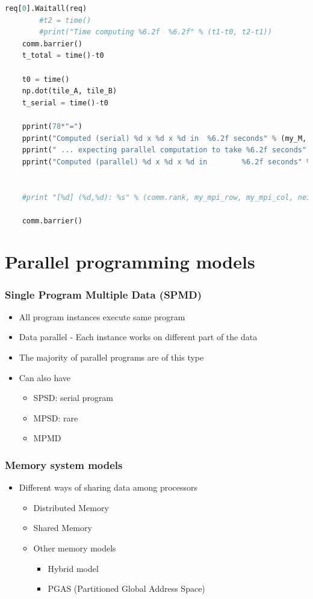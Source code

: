 \documentclass[10pt,t]{beamer}
\begin{document}
\begin{frame}
\begin{lstlisting}[language=Python,basicstyle=\tiny\ttfamily]
        req[0].Waitall(req)
        #t2 = time()
        #print("Time computing %6.2f  %6.2f" % (t1-t0, t2-t1))
    comm.barrier()
    t_total = time()-t0

    t0 = time()
    np.dot(tile_A, tile_B)
    t_serial = time()-t0

    pprint(78*"=")
    pprint("Computed (serial) %d x %d x %d in  %6.2f seconds" % (my_M, my_M, my_N, t_serial))
    pprint(" ... expecting parallel computation to take %6.2f seconds" % (mpi_rows*mpi_rows*mpi_cols*t_serial / comm.size))
    pprint("Computed (parallel) %d x %d x %d in        %6.2f seconds" % (mpi_rows*my_M, mpi_rows*my_M, mpi_cols*my_N, t_total))


    #print "[%d] (%d,%d): %s" % (comm.rank, my_mpi_row, my_mpi_col, neigh)

    comm.barrier()

\end{lstlisting}

\end{frame}

\section{Parallel programming models}
\begin{frame}
  \frametitle{Single Program Multiple Data (SPMD)}
  \begin{itemize}
  \item All program instances execute same program
  \item Data parallel - Each instance works on different part of the data
  \item The majority of parallel programs are of this type
  \item Can also have
    \begin{itemize}
    \item SPSD: serial program
    \item MPSD: rare
    \item MPMD 
    \end{itemize}
  \end{itemize}
\end{frame}

\begin{frame}
  \frametitle{Memory system models}
  \begin{itemize}
  \item Different ways of sharing data among processors
    \begin{itemize}
    \item Distributed Memory
    \item Shared Memory
    \item Other memory models
      \begin{itemize}
      \item Hybrid model
      \item PGAS (Partitioned Global Address Space) 
      \end{itemize}
    \end{itemize}
  \end{itemize}
\end{frame}
\end{document}
